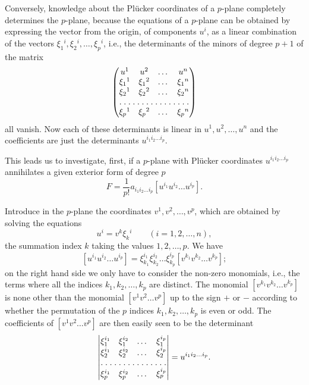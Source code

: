 Conversely, knowledge about the Pl\"ucker coordinates of a $p$-plane completely determines the $p$-plane, because the equations of a $p$-plane can be obtained by expressing the vector from the origin, of components $u^{i}$,  as a linear combination of the vectors $\xi_{1}{}^{i},\xi_{2}{}^{i},\dots,\xi_{p}{}^{i}$, {i.e.}, the determinants of the minors of degree $p+1$ of the matrix
\[
\begin{pmatrix}
  u^{1}&u^{2}&\dots&u^{n}\\
  \xi_{1}{}^{1}&\xi_{1}{}^{2}&\dots&\xi_{1}{}^{n}\\
  \xi_{2}{}^{1}&\xi_{2}{}^{2}&\dots&\xi_{2}{}^{n}\\
  \hdotsfor[1.5]{4}\\
  \xi_{p}{}^{1}&\xi_{p}{}^{2}&\dots&\xi_{p}{}^{n}\\
\end{pmatrix}
\]
all vanish. Now each of these determinants is linear in $u^{1},u^{2},\dots,u^{n}$ and the coefficients  are just the determinants $u^{i_{1}i_{2}\dots i_{p}}$.

\vspace{12pt}\fsec This leads us to investigate, first, if a $p$-plane with Pl\"ucker coordinates $u^{i_{1}i_{2}\dots i_{p}}$ annihilates a given exterior form of degree $p$
\[
F=\frac{1}{p!}a_{i_{1}i_{2}\dots i_{p}}[u^{i_{1}}u^{i_{2}}\dots u^{i_{p}}].
\]

Introduce in the $p$-plane the coordinates $v^{1},v^{2},\dots,v^{p}$, which are obtained by solving the equations
\[
u^{i}=v^{k}\xi_{k}{}^{i}\qquad (i=1,2,\dots,n),
\]
the summation index $k$ taking the values $1,2,\dots,p$. We have
\[
[u^{i_{1}}u^{i_{2}}\dots u^{i_{p}}]=\xi^{i_{1}}_{k_{1}}\xi^{i_{2}}_{k_{2}}\dots\xi^{i_{p}}_{k_{p}}[v^{k_{1}}v^{k_{2}}\dots v^{k_{p}}];
\]
on the right hand side we only have to consider the non-zero monomials, i.e., the terms where all the indices $k_{1},k_{2},\dots,k_{p}$ are distinct. The monomial $[v^{k_{1}}v^{k_{2}}\dots v^{k_{p}}]$ is none other than the monomial $[v^{1}v^{2}\dots v^{p}]$ up to the sign $+$ or $-$ according to whether the permutation of the $p$ indices $k_{1},k_{2},\dots,k_{p}$ is even or odd. The coefficients of $[v^{1}v^{2}\dots v^{p}]$ are then easily seen to be the determinant
\[
\begin{vmatrix}
  \xi_{1}^{i_{1}}&\xi_{1}^{i_{2}}&\dots&\xi_{1}^{i_{p}}\\
  \xi_{2}^{i_{1}}&\xi_{2}^{i_{2}}&\dots&\xi_{2}^{i_{p}}\\
  \hdotsfor[1.5]{4}\\
  \xi_{p}^{i_{1}}&\xi_{p}^{i_{2}}&\dots&\xi_{p}^{i_{p}}\\
\end{vmatrix}
=u^{i_{1}i_{2}\dots i_{p}}.
\]


